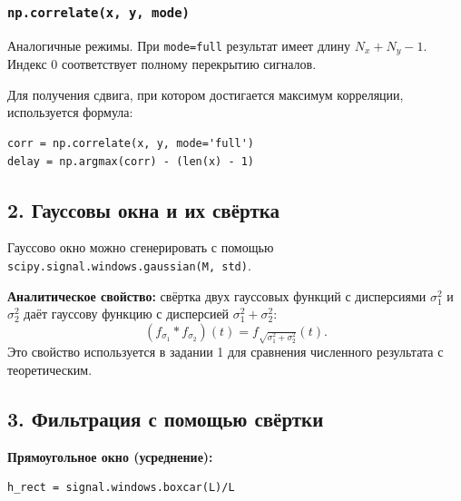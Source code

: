 \documentclass[12pt,a4paper,openany]{book}
\begin{document}
\subsubsection*{\texorpdfstring{\texttt{np.\allowbreak{}correlate(\allowbreak{}x,\allowbreak{}\ y,\allowbreak{}\ mode)}}{np.correlate(x, y, mode)}}

Аналогичные режимы. При \texttt{mode=\allowbreak{}\textquotesingle{}\allowbreak{}full\textquotesingle{}\allowbreak{}} результат имеет длину \(N_x+N_y-1\). Индекс 0 соответствует полному перекрытию сигналов.

Для получения сдвига, при котором достигается максимум корреляции, используется формула:

\begin{Verbatim}[fontsize=\small, breaklines, breakanywhere]
corr = np.correlate(x, y, mode='full')
delay = np.argmax(corr) - (len(x) - 1)
\end{Verbatim}

\subsection*{2. Гауссовы окна и их свёртка}

Гауссово окно можно сгенерировать с помощью \texttt{scipy.\allowbreak{}signal.\allowbreak{}windows.\allowbreak{}gaussian(\allowbreak{}M,\allowbreak{}\ std)}.

\textbf{Аналитическое свойство:} свёртка двух гауссовых функций с дисперсиями \(\sigma_1^2\) и \(\sigma_2^2\) даёт гауссову функцию с дисперсией \(\sigma_1^2+\sigma_2^2\):
\[
(f_{\sigma_1} * f_{\sigma_2})(t) = f_{\sqrt{\sigma_1^2+\sigma_2^2}}(t).
\]
Это свойство используется в задании 1 для сравнения численного результата с теоретическим.

\subsection*{3. Фильтрация с помощью свёртки}

\textbf{Прямоугольное окно (усреднение):}

\begin{Verbatim}[fontsize=\small, breaklines, breakanywhere]
h_rect = signal.windows.boxcar(L)/L
\end{Verbatim}
\end{document}
